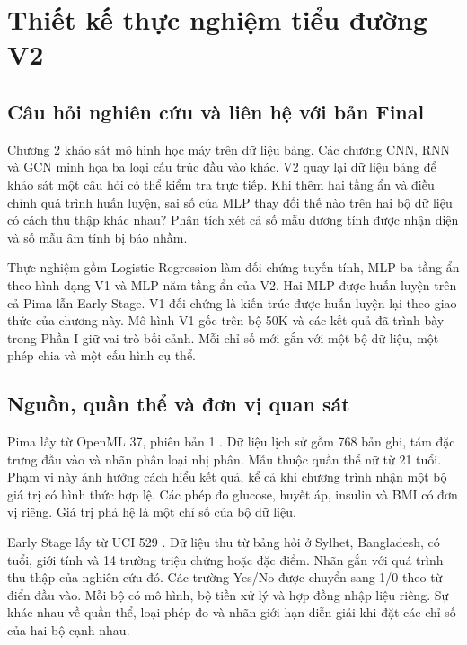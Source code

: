 \chapter{Thiết kế thực nghiệm tiểu đường V2}\label{ch:v2-protocol}

\section{Câu hỏi nghiên cứu và liên hệ với bản Final}
Chương 2 khảo sát mô hình học máy trên dữ liệu bảng. Các chương CNN, RNN và GCN minh họa ba loại cấu trúc đầu vào khác. V2 quay lại dữ liệu bảng để khảo sát một câu hỏi có thể kiểm tra trực tiếp. Khi thêm hai tầng ẩn và điều chỉnh quá trình huấn luyện, sai số của MLP thay đổi thế nào trên hai bộ dữ liệu có cách thu thập khác nhau? Phân tích xét cả số mẫu dương tính được nhận diện và số mẫu âm tính bị báo nhầm.

Thực nghiệm gồm Logistic Regression làm đối chứng tuyến tính, MLP ba tầng ẩn theo hình dạng V1 và MLP năm tầng ẩn của V2. Hai MLP được huấn luyện trên cả Pima lẫn Early Stage. V1 đối chứng là kiến trúc được huấn luyện lại theo giao thức của chương này. Mô hình V1 gốc trên bộ 50K và các kết quả đã trình bày trong Phần I giữ vai trò bối cảnh. Mỗi chỉ số mới gắn với một bộ dữ liệu, một phép chia và một cấu hình cụ thể.



\section{Nguồn, quần thể và đơn vị quan sát}
Pima lấy từ OpenML 37, phiên bản 1 \cite{pima-v2}. Dữ liệu lịch sử gồm 768 bản ghi, tám đặc trưng đầu vào và nhãn phân loại nhị phân. Mẫu thuộc quần thể nữ từ 21 tuổi. Phạm vi này ảnh hưởng cách hiểu kết quả, kể cả khi chương trình nhận một bộ giá trị có hình thức hợp lệ. Các phép đo glucose, huyết áp, insulin và BMI có đơn vị riêng. Giá trị phả hệ là một chỉ số của bộ dữ liệu.

Early Stage lấy từ UCI 529 \cite{early-v2}. Dữ liệu thu từ bảng hỏi ở Sylhet, Bangladesh, có tuổi, giới tính và 14 trường triệu chứng hoặc đặc điểm. Nhãn gắn với quá trình thu thập của nghiên cứu đó. Các trường Yes/No được chuyển sang 1/0 theo từ điển đầu vào. Mỗi bộ có mô hình, bộ tiền xử lý và hợp đồng nhập liệu riêng. Sự khác nhau về quần thể, loại phép đo và nhãn giới hạn diễn giải khi đặt các chỉ số của hai bộ cạnh nhau.





